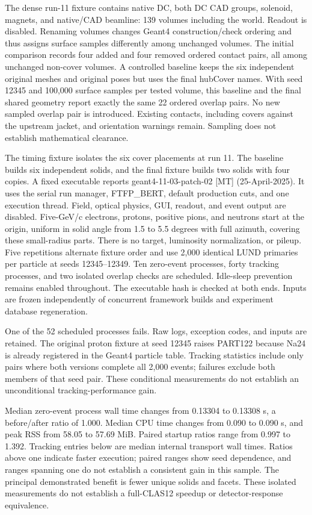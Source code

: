 The dense run-11 fixture contains native DC, both DC CAD groups, solenoid, magnets, and native/CAD beamline:
139 volumes including the world. Readout is disabled. Renaming volumes changes Geant4 construction/check
ordering and thus assigns surface samples differently among unchanged volumes. The initial comparison records
four added and four removed ordered contact pairs, all among unchanged non-cover volumes. A controlled
baseline keeps the six independent original meshes and original poses but uses the final hubCover names. With
seed 12345 and 100,000 surface samples per tested volume, this baseline and the final shared geometry report
exactly the same 22 ordered overlap pairs. No new sampled overlap pair is introduced. Existing contacts,
including covers against the upstream jacket, and orientation warnings remain. Sampling does not establish
mathematical clearance.

The timing fixture isolates the six cover placements at run 11. The baseline builds six independent solids,
and the final fixture builds two solids with four copies. A fixed executable reports geant4-11-03-patch-02
[MT]   (25-April-2025). It uses the serial run manager, FTFP\_BERT, default production cuts, and one execution
thread. Field, optical physics, GUI, readout, and event output are disabled. Five-GeV/c electrons, protons,
positive pions, and neutrons start at the origin, uniform in solid angle from 1.5 to 5.5 degrees with full
azimuth, covering these small-radius parts. There is no target, luminosity normalization, or pileup. Five
repetitions alternate fixture order and use 2,000 identical LUND primaries per particle at seeds 12345--12349.
Ten zero-event processes, forty tracking processes, and two isolated overlap checks are scheduled. Idle-sleep
prevention remains enabled throughout. The executable hash is checked at both ends. Inputs are frozen
independently of concurrent framework builds and experiment database regeneration.

One of the 52 scheduled processes fails. Raw logs, exception codes, and inputs are retained. The original
proton
fixture at seed 12345 raises PART122 because Na24 is already registered in the Geant4 particle table. Tracking
statistics include only pairs where both versions complete all 2,000 events; failures exclude both members of
that seed pair. These conditional measurements do not establish an unconditional tracking-performance gain.

Median zero-event process wall time changes from 0.13304 to 0.13308 s, a before/after ratio of 1.000. Median
CPU time changes from 0.090 to 0.090 s, and peak RSS from 58.05 to 57.69 MiB. Paired startup ratios range from
0.997 to 1.392. Tracking entries below are median internal transport wall times. Ratios above one indicate
faster execution; paired ranges show seed dependence, and ranges spanning one do not establish a consistent
gain in this sample. The principal demonstrated benefit is fewer unique solids and facets. These isolated
measurements do not establish a full-CLAS12 speedup or detector-response equivalence.


